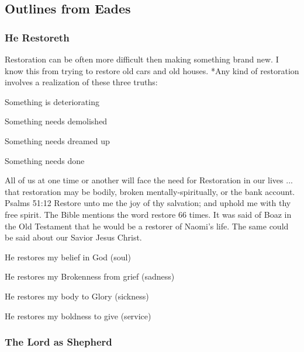 \subsection{Outlines from Eades}

\subsubsection{He Restoreth}

Restoration can be often more difficult then making something brand new. I know this from trying to restore old cars and old houses. 
*Any kind of restoration involves a realization of these three truths:\\
\begin{compactenum}[I.]
    \item Something is deteriorating
    \item Something needs demolished
    \item Something needs dreamed up
    \item Something needs done\\
\end{compactenum}
All of us at one time or another will face the need for Restoration in our lives ... that restoration may be bodily, broken mentally-spiritually, or the bank account.
Psalms 51:12
Restore unto me the joy of thy salvation; and uphold me with thy free spirit.
The Bible mentions the word restore 66 times. It was said of Boaz in the Old Testament that he would be a restorer of Naomi's life. The same could be said about our Savior Jesus Christ.\\
\begin{compactenum}[I.]
    \item He restores my belief in God (soul)
    \item He restores my Brokenness from grief (sadness)
    \item He restores my body to Glory (sickness)
    \item He restores my boldness to give (service)\\
\end{compactenum}



\subsubsection{The Lord as Shepherd}

